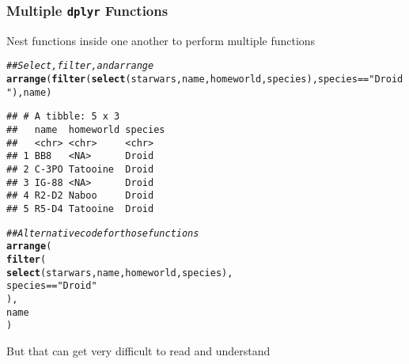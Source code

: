 \documentclass{beamer}\usepackage[]{graphicx}\usepackage[]{color}
\makeatletter
\newcommand{\hlstr}[1]{\textcolor[rgb]{0.192,0.494,0.8}{#1}}%
\newcommand{\hlcom}[1]{\textcolor[rgb]{0.678,0.584,0.686}{\textit{#1}}}%
\newcommand{\hlopt}[1]{\textcolor[rgb]{0,0,0}{#1}}%
\newcommand{\hlstd}[1]{\textcolor[rgb]{0.345,0.345,0.345}{#1}}%
\newcommand{\hlkwd}[1]{\textcolor[rgb]{0.737,0.353,0.396}{\textbf{#1}}}%
\newenvironment{kframe}{%
 \def\at@end@of@kframe{}%
 \ifinner\ifhmode%
  \def\at@end@of@kframe{\end{minipage}}%
  \begin{minipage}{\columnwidth}%
 \fi\fi%
 \def\FrameCommand##1{\hskip\@totalleftmargin \hskip-\fboxsep
 \colorbox{shadecolor}{##1}\hskip-\fboxsep
     \hskip-\linewidth \hskip-\@totalleftmargin \hskip\columnwidth}%
 \MakeFramed {\advance\hsize-\width
   \@totalleftmargin\z@ \linewidth\hsize
   \@setminipage}}%
 {\par\unskip\endMakeFramed%
 \at@end@of@kframe}
\newenvironment{knitrout}{}{} %
\makeatother
\begin{document}
\begin{frame}[fragile]\frametitle{Multiple \texttt{dplyr} Functions}
    Nest functions inside one another to perform multiple functions
\begin{knitrout}\footnotesize
{}\color{fgcolor}\begin{kframe}
\begin{alltt}
\hlcom{## Select, filter, and arrange}
\hlkwd{arrange}\hlstd{(}\hlkwd{filter}\hlstd{(}\hlkwd{select}\hlstd{(starwars, name, homeworld, species), species} \hlopt{==} \hlstr{"Droid"}\hlstd{), name)}
\end{alltt}
\begin{verbatim}
## # A tibble: 5 x 3
##   name  homeworld species
##   <chr> <chr>     <chr>  
## 1 BB8   <NA>      Droid  
## 2 C-3PO Tatooine  Droid  
## 3 IG-88 <NA>      Droid  
## 4 R2-D2 Naboo     Droid  
## 5 R5-D4 Tatooine  Droid
\end{verbatim}
\end{kframe}
\end{knitrout}
\begin{knitrout}\footnotesize
{}\color{fgcolor}\begin{kframe}
\begin{alltt}
\hlcom{## Alternative code for those functions}
\hlkwd{arrange}\hlstd{(}
  \hlkwd{filter}\hlstd{(}
    \hlkwd{select}\hlstd{(starwars, name, homeworld, species),}
    \hlstd{species} \hlopt{==} \hlstr{"Droid"}
  \hlstd{),}
  \hlstd{name}
\hlstd{)}
\end{alltt}
\end{kframe}
\end{knitrout}
    \vspace{1ex}
    But that can get very difficult to read and understand
\end{frame}
\end{document}
